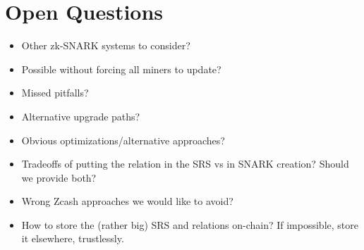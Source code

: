 \section{Open Questions}
  \begin{itemize}
    \item Other zk-SNARK systems to consider?
    \item Possible without forcing all miners to update?
    \item Missed pitfalls?
    \item Alternative upgrade paths?
    \item Obvious optimizations/alternative approaches?
    \item Tradeoffs of putting the relation in the SRS vs in SNARK creation?
    Should we provide both?
    \item Wrong Zcash approaches we would like to avoid?
    \item How to store the (rather big) SRS and relations on-chain? If
    impossible, store it elsewhere, trustlessly.
  \end{itemize}
